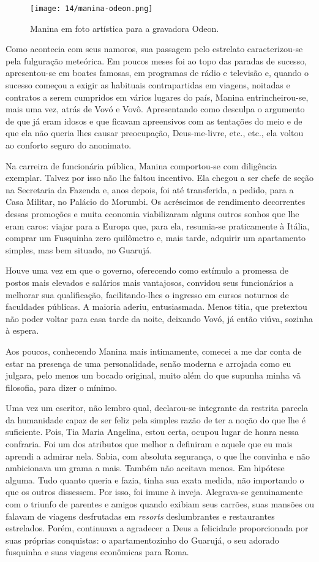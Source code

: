 \begin{figure}
\centering
\texttt{[image: 14/manina-odeon.png]}
\caption{Manina em foto artística para a gravadora Odeon.}
\end{figure}

Como acontecia com seus namoros, sua passagem pelo estrelato caracterizou-se pela fulguração meteórica.
Em poucos meses foi ao topo das paradas de sucesso, apresentou-se em boates famosas, em programas de rádio e televisão e, quando o sucesso começou a exigir as habituais contrapartidas em viagens, noitadas e contratos a serem cumpridos em vários lugares do país, Manina entrincheirou-se, mais uma vez, atrás de Vovó e Vovô.
Apresentando como desculpa o argumento de que já eram idosos e que ficavam apreensivos com as tentações do meio e de que ela não queria lhes causar preocupação, Deus-me-livre, etc., etc., ela voltou ao conforto seguro do anonimato.

Na carreira de funcionária pública, Manina comportou-se com diligência exemplar.
Talvez por isso não lhe faltou incentivo.
Ela chegou a ser chefe de seção na Secretaria da Fazenda e, anos depois, foi até transferida, a pedido, para a Casa Militar, no Palácio do Morumbi.
Os acréscimos de rendimento decorrentes dessas promoções e muita economia viabilizaram alguns outros sonhos que lhe eram caros: viajar para a Europa que, para ela, resumia-se praticamente à Itália, comprar um Fusquinha zero quilômetro e, mais tarde, adquirir um apartamento simples, mas bem situado, no Guarujá.

Houve uma vez em que o governo, oferecendo como estímulo a promessa de postos mais elevados e salários mais vantajosos, convidou seus funcionários a melhorar sua qualificação, facilitando-lhes o ingresso em cursos noturnos de faculdades públicas.
A maioria aderiu, entusiasmada.
Menos titia, que pretextou não poder voltar para casa tarde da noite, deixando Vovó, já então viúva, sozinha à espera.

Aos poucos, conhecendo Manina mais intimamente, comecei a me dar conta de estar na presença de uma personalidade, senão moderna e arrojada como eu julgara, pelo menos um bocado original, muito além do que supunha minha vã filosofia, para dizer o mínimo.

Uma vez um escritor, não lembro qual, declarou-se integrante da restrita parcela da humanidade capaz de ser feliz pela simples razão de ter a noção do que lhe é suficiente.
Pois, Tia Maria Angelina, estou certa, ocupou lugar de honra nessa confraria.
Foi um dos atributos que melhor a definiram e aquele que eu mais aprendi a admirar nela.
Sabia, com absoluta segurança, o que lhe convinha e não ambicionava um grama a mais.
Também não aceitava menos.
Em hipótese alguma.
Tudo quanto queria e fazia, tinha sua exata medida, não importando o que os outros dissessem.
Por isso, foi imune à inveja.
Alegrava-se genuinamente com o triunfo de parentes e amigos quando exibiam seus carrões, suas mansões ou falavam de viagens desfrutadas em \textit{resorts} deslumbrantes e restaurantes estrelados.
Porém, continuava a agradecer a Deus a felicidade proporcionada por suas próprias conquistas: o apartamentozinho do Guarujá, o seu adorado fusquinha e suas viagens econômicas para Roma.

